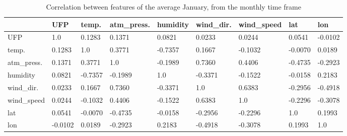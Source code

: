 \documentclass[11pt,a4paper,titlepage]{book}
\begin{document}
\begin{table}[ht]
    \small
    \begin{tabular}{@{}lllllllll@{}}
    \toprule
                & UFP     & temp.   & atm\_press. & humidity & wind\_dir. & wind\_speed & lat     & lon     \\ \midrule
    UFP         & 1.0     & 0.1283  & 0.1371      & 0.0821   & 0.0233     & 0.0244      & 0.0541  & -0.0102 \\
    temp.       & 0.1283  & 1.0     & 0.3771      & -0.7357  & 0.1667     & -0.1032     & -0.0070 & 0.0189  \\
    atm\_press. & 0.1371  & 0.3771  & 1.0         & -0.1989  & 0.7360     & 0.4406      & -0.4735 & -0.2923 \\
    humidity    & 0.0821  & -0.7357 & -0.1989     & 1.0      & -0.3371    & -0.1522     & -0.0158 & 0.2183  \\
    wind\_dir.  & 0.0233  & 0.1667  & 0.7360      & -0.3371  & 1.0        & 0.6383      & -0.2956 & -0.4918 \\
    wind\_speed & 0.0244  & -0.1032 & 0.4406      & -0.1522  & 0.6383     & 1.0         & -0.2296 & -0.3078 \\
    lat         & 0.0541  & -0.0070 & -0.4735     & -0.0158  & -0.2956    & -0.2296     & 1.0     & 0.1993  \\
    lon         & -0.0102 & 0.0189  & -0.2923     & 0.2183   & -0.4918    & -0.3078     & 0.1993  & 1.0     \\ \bottomrule
    \end{tabular}
    \caption{Correlation between features of the average January, from the monthly time frame}
    \label{cleanair:correlation-table-january}
\end{table}
\end{document}
